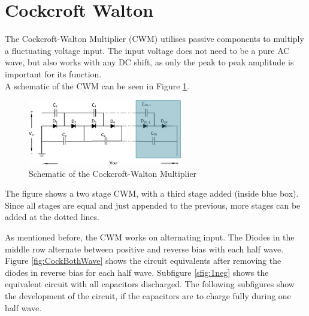 \section{Cockcroft Walton}\label{ch:cock}
The Cockcroft-Walton Multiplier (CWM) utilises passive components to multiply a fluctuating voltage input.
The input voltage does not need to be a pure AC wave,
but also works with any DC shift,
as only the peak to peak amplitude is important for its function.\\
A schematic of the CWM can be seen in Figure \ref{fig:CWM}.

\begin{figure}[H]
   \centering
   \includegraphics[width=0.6\textwidth]{figures/xCockroftWalton/CockroftWalton.pdf}
    \caption{Schematic of the Cockcroft-Walton Multiplier}
	\label{fig:CWM}
\end{figure}

The figure shows a two stage CWM,
with a third stage added (inside blue box).
Since all stages are equal and just appended to the previous,
more stages can be added at the dotted lines.

As mentioned before,
the CWM works on alternating input.
The Diodes in the middle row alternate between positive and reverse bias with each half wave.
Figure \ref{fig:CockBothWave} shows the circuit equivalents after removing the diodes in reverse bias for each half wave.
Subfigure \ref{sfig:1neg} shows the equivalent circuit with all capacitors discharged.
The following subfigures show the development of the circuit,
if the capacitors are to charge fully during one half wave.

